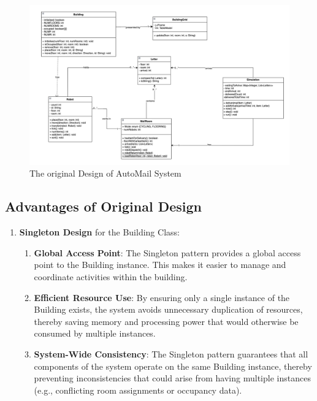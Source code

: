 \documentclass[12pt]{article}
\begin{document}
\begin{figure}[H]
    \centering
    \includegraphics[width=1\linewidth]{Original Design.png}
    \caption{The original Design of AutoMail System}
    \label{fig:enter-label}
\end{figure}

\subsection{Advantages of Original Design}
\begin{enumerate}
    \item \textbf{Singleton Design} for the Building Class:
    \begin{enumerate}
        \item \textbf{Global Access Point}: The Singleton pattern provides a global access point to the Building instance. This makes it easier to manage and coordinate activities within the building.
        \item \textbf{Efficient Resource Use}: By ensuring only a single instance of the Building exists, the system avoids unnecessary duplication of resources, thereby saving memory and processing power that would otherwise be consumed by multiple instances.
        \item \textbf{System-Wide Consistency}: The Singleton pattern guarantees that all components of the system operate on the same Building instance, thereby preventing inconsistencies that could arise from having multiple instances (e.g., conflicting room assignments or occupancy data).
    \end{enumerate}
\end{enumerate}
\end{document}
